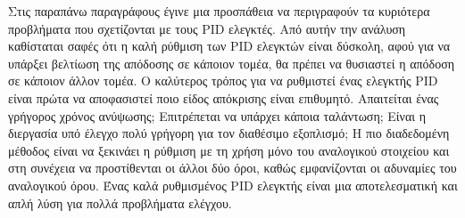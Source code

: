 Στις παραπάνω παραγράφους έγινε μια προσπάθεια να περιγραφούν τα κυριότερα προβλήματα που σχετίζονται με τους PID ελεγκτές. Από αυτήν την ανάλυση καθίσταται σαφές ότι η καλή ρύθμιση των PID ελεγκτών είναι δύσκολη, αφού για να υπάρξει βελτίωση της απόδοσης σε κάποιον τομέα, θα πρέπει να θυσιαστεί η απόδοση σε κάποιον άλλον τομέα. Ο καλύτερος τρόπος για να ρυθμιστεί ένας ελεγκτής PID είναι πρώτα να αποφασιστεί ποιο είδος απόκρισης είναι επιθυμητό. Απαιτείται ένας γρήγορος χρόνος ανύψωσης; Επιτρέπεται να υπάρχει κάποια ταλάντωση; Είναι η διεργασία υπό έλεγχο πολύ γρήγορη για τον διαθέσιμο εξοπλισμό; Η πιο διαδεδομένη μέθοδος είναι να ξεκινάει η ρύθμιση με τη χρήση μόνο του αναλογικού στοιχείου και στη συνέχεια να προστίθενται οι άλλοι δύο όροι, καθώς εμφανίζονται οι αδυναμίες του αναλογικού όρου. Ένας καλά ρυθμισμένος PID ελεγκτής είναι μια αποτελεσματική και απλή λύση για πολλά προβλήματα ελέγχου.




